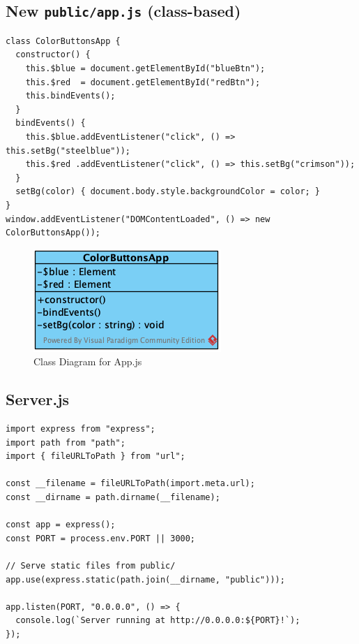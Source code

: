 \subsection*{New \texttt{public/app.js} (class-based)}
\begin{verbatim}
class ColorButtonsApp {
  constructor() {
    this.$blue = document.getElementById("blueBtn");
    this.$red  = document.getElementById("redBtn");
    this.bindEvents();
  }
  bindEvents() {
    this.$blue.addEventListener("click", () => this.setBg("steelblue"));
    this.$red .addEventListener("click", () => this.setBg("crimson"));
  }
  setBg(color) { document.body.style.backgroundColor = color; }
}
window.addEventListener("DOMContentLoaded", () => new ColorButtonsApp());
\end{verbatim}

\begin{figure}[htbp]
  \centering
  \includegraphics[width=.95\linewidth]{png/docker/DockerOnAWSGroup.png}
  \caption{Class Diagram for App.js}
\end{figure}

\subsection*{Server.js}
\begin{verbatim}
import express from "express";
import path from "path";
import { fileURLToPath } from "url";

const __filename = fileURLToPath(import.meta.url);
const __dirname = path.dirname(__filename);

const app = express();
const PORT = process.env.PORT || 3000;

// Serve static files from public/
app.use(express.static(path.join(__dirname, "public")));

app.listen(PORT, "0.0.0.0", () => {
  console.log(`Server running at http://0.0.0.0:${PORT}!`);
});
\end{verbatim}


